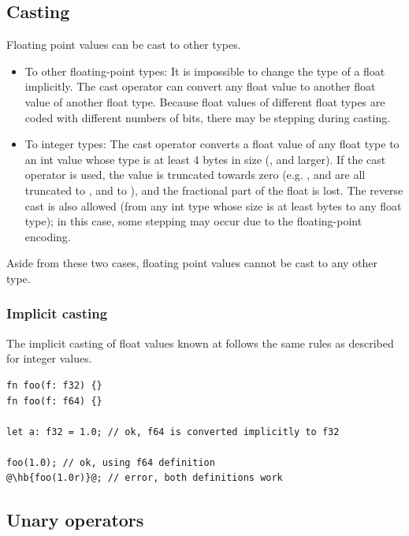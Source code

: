 \subsection{Casting}

Floating point values can be cast to other types.

\begin{itemize}
  \setlength\itemsep{-4pt}
\item To other floating-point types: It is impossible to change the type of a
  float implicitly. The cast operator  can convert any float
  value to another float value of another float type. Because float values of
  different float types are coded with different numbers of bits, there may be
  stepping during casting.

\item To integer types: The cast operator converts a float value
  of any float type to an int value whose type is at least 4 bytes in size
  (,  and larger). If the cast operator is used, the
  value is truncated towards zero (e.g. ,  and
   are all truncated to , and  to ),
  and the fractional part of the float is lost. The reverse cast is also allowed (from
  any int type whose size is at least  bytes to any float type); in
  this case, some stepping may occur due to the floating-point encoding.

\end{itemize}

Aside from these two cases, floating point values cannot be cast to any other
type.

\subsubsection{Implicit casting}

The implicit casting of float values known at  follows the same
rules as described for integer  values.

\begin{lstlisting}[style=coloredverbatimError, escapechar=@]
fn foo(f: f32) {}
fn foo(f: f64) {}

let a: f32 = 1.0; // ok, f64 is converted implicitly to f32

foo(1.0); // ok, using f64 definition
@\hb{foo(1.0r)}@; // error, both definitions work
\end{lstlisting}

\subsection{Unary operators}

